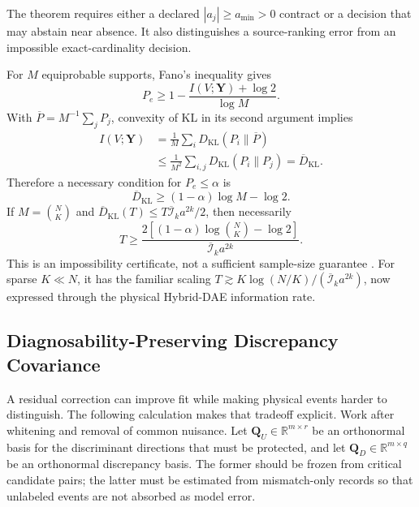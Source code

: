 The theorem requires either a declared $|a_j|\ge a_{\min}>0$ contract or a
decision that may abstain near absence. It also distinguishes a source-ranking
error from an impossible exact-cardinality decision.

For $M$ equiprobable supports, Fano's inequality gives
\begin{equation}
 P_e\ge1-\frac{I(V;\bm Y)+\log 2}{\log M}.
 \label{eq:supp-fano-basic}
\end{equation}
With $\overline P=M^{-1}\sum_jP_j$, convexity of KL in its second argument
implies
\begin{equation}
 \begin{aligned}
 I(V;\bm Y)
 &=\frac1M\sum_iD_{\mathrm{KL}}(P_i\|\overline P)\\
 &\le\frac1{M^2}\sum_{i,j}D_{\mathrm{KL}}(P_i\|P_j)
 =\overline D_{\mathrm{KL}}.
 \end{aligned}
 \label{eq:supp-average-pairwise-kl}
\end{equation}
Therefore a necessary condition for $P_e\le\alpha$ is
\begin{equation}
 \overline D_{\mathrm{KL}}
 \ge(1-\alpha)\log M-\log 2.
 \label{eq:supp-fano-necessary-information}
\end{equation}
If $M={N\choose K}$ and
$\overline D_{\mathrm{KL}}(T)\le
T\overline{\mathcal I}_ka^{2k}/2$, then necessarily
\begin{equation}
 T\ge
 \frac{2[(1-\alpha)\log {N\choose K}-\log 2]}
 {\overline{\mathcal I}_ka^{2k}}.
 \label{eq:supp-fano-horizon-bound}
\end{equation}
This is an impossibility certificate, not a sufficient sample-size guarantee
\cite{cover2006elements,tsybakov2009nonparametric}. For sparse $K\ll N$, it
has the familiar scaling
$T\gtrsim K\log(N/K)/(\overline{\mathcal I}_ka^{2k})$, now expressed through
the physical Hybrid-DAE information rate.

\subsection{Diagnosability-Preserving Discrepancy Covariance}

A residual correction can improve fit while making physical events harder to
distinguish.  The following calculation makes that tradeoff explicit.  Work
after whitening and removal of common nuisance.  Let $\bm Q_U\in\mathbb R^{m\times r}$
be an orthonormal basis for the discriminant directions that must be protected,
and let $\bm Q_D\in\mathbb R^{m\times q}$ be an orthonormal discrepancy basis.
The former should be frozen from critical candidate pairs; the latter must be
estimated from mismatch-only records so that unlabeled events are not absorbed
as model error.

